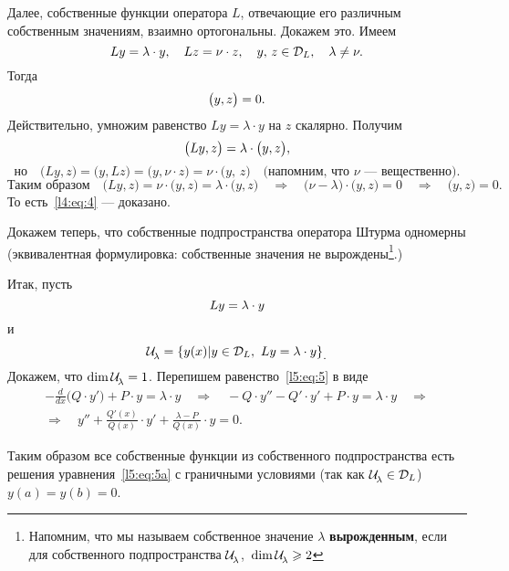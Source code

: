 \documentclass[12pt,a4paper,openany,fleqn]{book}
\newcommand{\mc}[1]{\ensuremath{\mathcal{#1}}}
\newcommand{\der}[2]{\ensuremath{\frac{d#1}{d#2}}}
\newcommand{\LL}{\ensuremath{L}}
\newcommand{\Ul}[1][\lambda]{\ensuremath{\mc{U}\!{\mathstrut}_{#1}}}
\theoremstyle{definition}
\begin{document}
Далее, собственные функции оператора \LL, отвечающие его различным собственным значениям, взаимно ортогональны. Докажем это. Имеем
\begin{equation*}
	\hfill\LL y=\lambda\cdot y,\quad\LL z=\nu\cdot z,\quad y,\,z\in\mc{D}_{\LL},\quad \lambda\neq\nu.\hfill
\end{equation*}   
Тогда 
\begin{equation}
	\label{l5:eq:4}
	\hfill \big(y,z\big)=0.\hfill
\end{equation}
Действительно, умножим равенство $\LL y=\lambda\cdot y$ на $z$ скалярно. Получим
\begin{equation*}
	\hfill\big(\LL y,z\big)=\lambda\cdot\big(y,z\big),\hfill
\end{equation*}
\begin{equation*}
	\text{но}\quad\big(\LL y,z\big)=\big(y,\LL z\big)=\big(y,\nu\cdot z\big)=\nu\cdot\big(y,\,z\big)\quad\text{(напомним, что $\nu$ --- вещественно).}
\end{equation*}
\begin{equation*}
	\text{Таким образом}\quad\big(\LL y,z\big)=\nu\cdot\big(y,z\big)=\lambda\cdot\big(y,z\big)\quad\Rightarrow\quad \big(\nu-\lambda\big)\cdot \big(y,z\big)=0\quad\Rightarrow\quad\big(y,z\big)=0.
\end{equation*}
То есть~\eqref{l4:eq:4} --- доказано.

Докажем теперь, что собственные подпространства оператора Штурма одномерны (эквивалентная формулировка: собственные значения не вырождены\footnote{Напомним, что мы называем собственное значение $\lambda$ \textbf{вырожденным}, если для собственного подпространства \Ul,\ $\dim\Ul\geqslant2$}.)

Итак, пусть 
\begin{equation}
	\label{l5:eq:5}
	\hfill\LL y=\lambda\cdot y\hfill
\end{equation}
и
\begin{equation*}
	\hfill\Ul=\left\{y(x)|y\in\mc{D}_{\LL},\ Ly=\lambda\cdot y\right\}_{\displaystyle.}\hfill
\end{equation*}
Докажем, что $\dim\Ul=1$. Перепишем равенство~\eqref{l5:eq:5} в виде
\begin{multline}
	\label{l5:eq:5a}
	-\der{}{x}\big(Q\cdot y'\big)+P\cdot y=\lambda\cdot y\quad\Rightarrow\quad-Q\cdot y''-Q'\cdot y'+P\cdot y=\lambda\cdot y\quad\Rightarrow\\\Rightarrow\quad y''+\frac{Q'(x)}{Q(x)}\cdot y'+\frac{\lambda-P}{Q(x)}\cdot y=0.\tag{\theequation a}	
\end{multline}
\addtocounter{equation}{1} Таким образом все собственные функции из собственного подпространства есть решения уравнения~\eqref{l5:eq:5a} с граничными условиями (так как $\Ul\in\mc{D}_{L}$) $y(a)=y(b)=0$.
\end{document}
